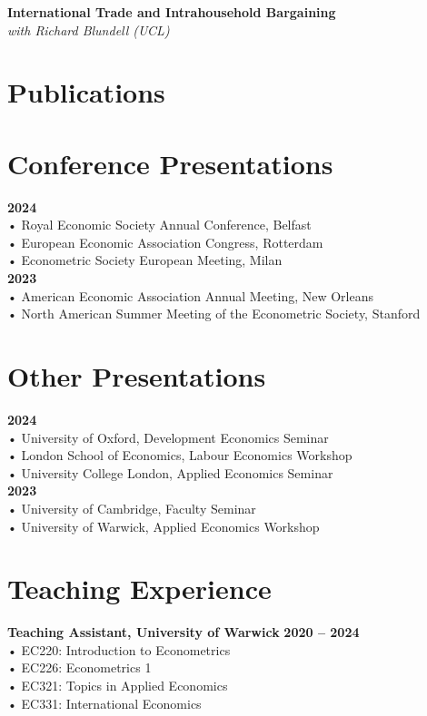 \documentclass[11pt,a4paper]{article}
\begin{document}
\textbf{International Trade and Intrahousehold Bargaining} \\
\textit{with Richard Blundell (UCL)} \\

\section{Publications}

\section{Conference Presentations}
\textbf{2024} \\
• Royal Economic Society Annual Conference, Belfast \\
• European Economic Association Congress, Rotterdam \\
• Econometric Society European Meeting, Milan \\

\textbf{2023} \\
• American Economic Association Annual Meeting, New Orleans \\
• North American Summer Meeting of the Econometric Society, Stanford \\

\section{Other Presentations}
\textbf{2024} \\
• University of Oxford, Development Economics Seminar \\
• London School of Economics, Labour Economics Workshop \\
• University College London, Applied Economics Seminar \\

\textbf{2023} \\
• University of Cambridge, Faculty Seminar \\
• University of Warwick, Applied Economics Workshop \\

\section{Teaching Experience}
\textbf{Teaching Assistant, University of Warwick} \hfill \textbf{2020 -- 2024} \\
• EC220: Introduction to Econometrics \\
• EC226: Econometrics 1 \\
• EC321: Topics in Applied Economics \\
• EC331: International Economics \\
\end{document}
